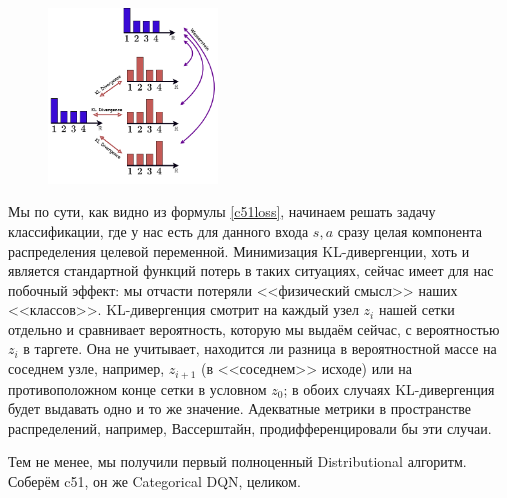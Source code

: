 \begin{figure}
\centering
\includegraphics[width=0.4\textwidth]{Images/KLgeometry.png}
\vspace{-0.8cm}
\end{figure}

Мы по сути, как видно из формулы \eqref{c51loss}, начинаем решать задачу классификации, где у нас есть для данного входа $s, a$ сразу целая компонента распределения целевой переменной. Минимизация KL-дивергенции, хоть и является стандартной функций потерь в таких ситуациях, сейчас имеет для нас побочный эффект: мы отчасти потеряли <<физический смысл>> наших <<классов>>. KL-дивергенция смотрит на каждый узел $z_i$ нашей сетки отдельно и сравнивает вероятность, которую мы выдаём сейчас, с вероятностью $z_i$ в таргете. Она не учитывает, находится ли разница в вероятностной массе на соседнем узле, например, $z_{i+1}$ (в <<соседнем>> исходе) или на противоположном конце сетки в условном $z_0$; в обоих случаях KL-дивергенция будет выдавать одно и то же значение. Адекватные метрики в пространстве распределений, например, Вассерштайн, продифференцировали бы эти случаи.

Тем не менее, мы получили первый полноценный Distributional алгоритм. Соберём c51, он же Categorical DQN, целиком.

